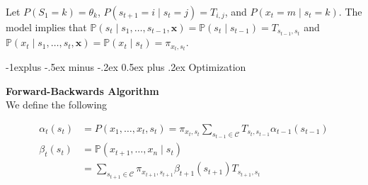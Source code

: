 \documentclass[10pt,landscape]{article}
\makeatletter
\newcommand{\p}{\mathbb{P}}
\renewcommand{\subsection}{\@startsection{subsection}{2}{0mm}%
                                {-1explus -.5ex minus -.2ex}%
                                {0.5ex plus .2ex}%
                                {\normalfont\normalsize\bfseries}}
\makeatother
\begin{document}
\begin{multicols*}{3}
	\begin{center}
	\end{center}

	Let $P(S_1 = k)=\theta_k$, $P(s_{t+1} = i\mid s_t = j)=T_{i,j}$, and $P(x_t = m\mid s_t=k)$. The model implies that $\mathbb{P}(s_{t} \mid s_{1}, \dots, s_{t - 1}, \mathbf{x}) = \mathbb{P}(s_{t} \mid s_{t - 1}) = T_{s_{t - 1}, s_{t}}$ and $\mathbb{P}(x_{t} \mid s_{1}, \dots, s_{t}, \mathbf{x}) = \mathbb{P}(x_{t} \mid s_{t}) = \pi_{x_{t}, s_{t}}$.

	\subsection{Optimization}
	\begin{minipage}{\linewidth}
		\centering
	\end{minipage} \vspace{-0.25 cm}

	\textbf{Forward-Backwards Algorithm}\\
	We define the following

	\begin{equation*}\begin{aligned}
			\alpha_{t}(s_{t}) & = P(x_{1}, \dots, x_{t}, s_{t})
			= \pi_{x_{t}, s_{t}} \sum_{s_{t-1} \in \mathcal{C}} T_{s_{t}, s_{t - 1}} \alpha_{t - 1}(s_{t - 1})                              \\
			\beta_{t}(s_{t})  & = \p(x_{t + 1}, \dots, x_{n} \mid s_{t})                                                                    \\
			                  & = \sum_{s_{t + 1} \in \mathcal{C}} \pi_{x_{t + 1}, s_{t + 1}} \beta_{t + 1}(s_{t + 1}) T_{s_{t + 1}, s_{t}}
		\end{aligned}\end{equation*}


\end{multicols*}
\end{document}
